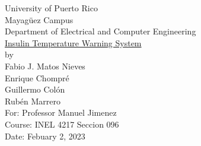 \begin{titlepage}
  \begin{center}
    \large{University of Puerto Rico\\
    Mayagüez Campus\\
    \vspace{\baselineskip}
    Department of Electrical and Computer Engineering\\}
    \vspace{6cm}
    \Huge{\underline{Insulin Temperature Warning System}\\}
    \vspace{0.5\baselineskip}
    \large by\\
    Fabio J. Matos Nieves\\
    Enrique Chompré\\
    Guillermo Colón\\
    Rubén Marrero\\
    \vspace{3.5cm}
    For: Professor Manuel Jimenez\\
    Course: INEL 4217 Seccion 096\\
    Date: Febuary 2, 2023\\
    \normalsize

  \end{center}
\end{titlepage}

